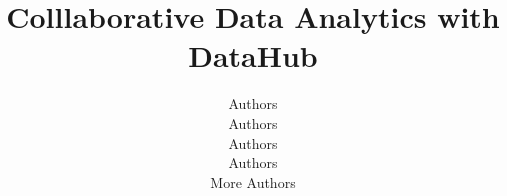 \documentclass{vldb}
\begin{document}
\title{\hspace{-10pt} Colllaborative Data Analytics with DataHub}
\author{
    Authors\\ Authors \\ Authors \\ Authors \\ More Authors \\ 
}
\maketitle



\end{document}
